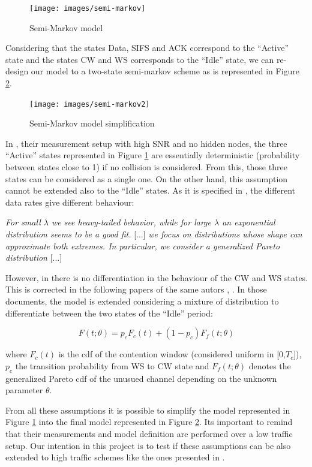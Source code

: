 \begin{figure}[H]
\centering
\texttt{[image: images/semi-markov]}
\caption{Semi-Markov model}
\label{semi-markov}
\end{figure}

Considering that the states Data, SIFS and ACK correspond to the ``Active'' state and the states CW and WS corresponds to the ``Idle'' state, we can re-design our model to a two-state semi-markov scheme as is represented in Figure \ref{semi-markov2}.

\begin{figure}[H]
\centering
\texttt{[image: images/semi-markov2]}
\caption{Semi-Markov model simplification}
\label{semi-markov2}
\end{figure}

In \cite{gts1}, their measurement setup with high SNR and no hidden nodes, the three ``Active'' states represented in Figure \ref{semi-markov} are essentially deterministic (probability between states close to 1) if no collision is considered. From this, those three states can be considered as a single one.
On the other hand, this assumption cannot be extended also to the ``Idle'' states. As it is specified in \cite{gts1}, the different data rates give different behaviour:

\begin{flushright}
\small \textit{For small $\lambda$ we see heavy-tailed behavior, while for large $\lambda$ an exponential distribution seems to be a good fit.} [...] \textit{we focus on distributions whose shape can approximate both extremes. In particular, we consider a generalized Pareto distribution} [...]
\end{flushright}

However, in \cite{gts1} there is no differentiation in the behaviour of the CW and WS states. This is corrected in the following papers of the same autors \cite{gts2}, \cite{gts3}. In those documents, the model is extended considering a mixture of distribution to differentiate between the two states of the ``Idle'' period:

\begin{equation}
F(t;\theta)=p_cF_c(t)+(1-p_c)F_f(t;\theta)
\label{eq:idle_mixture}
\end{equation}

where $F_c(t)$ is the cdf of the contention window (considered uniform in [0,$T_c$]), $p_c$ the transition probability from WS to CW state and $F_f(t;\theta)$ denotes the generalized Pareto cdf of the unusued channel depending on the unknown parameter $\theta$.

From all these assumptions it is possible to simplify the model represented in Figure \ref{semi-markov} into the final model represented in Figure \ref{semi-markov2}. Its important to remind that their measurements and model definition are performed over a low traffic setup. Our intention in this project is to test if these assumptions can be also extended to high traffic schemes like the ones presented in \cite{hkps1}.